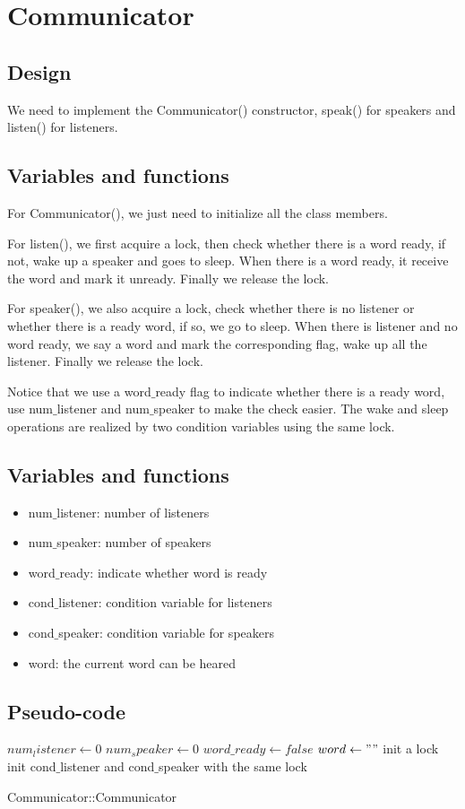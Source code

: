 \documentclass[a4paper,10pt]{article}
\begin{document}
\section{Communicator}
\subsection{Design}

We need to implement the Communicator() constructor, speak() for speakers and listen() for listeners.
\subsection{Variables and functions}
For Communicator(), we just need to initialize all the class members.

For listen(), we first acquire a lock, then check whether there is a word ready, if not, wake up a speaker and goes to sleep. When there is a word ready, it receive the word and mark it unready. Finally we release the lock.

For speaker(), we also acquire a lock, check whether there is no listener or whether there is a ready word, if so, we go to sleep. When there is listener and no word ready, we say a word and mark the corresponding flag, wake up all the listener. Finally we release the lock.

Notice that we use a word$\_$ready flag to indicate whether there is a ready word, use num$\_$listener and num$\_$speaker to make the check easier. The wake and sleep operations are realized by two condition variables using the same lock.
\subsection {Variables and functions}
\begin{itemize}
\item num$\_$listener: number of listeners
\item num$\_$speaker: number of speakers
\item word$\_$ready: indicate whether word is ready
\item cond$\_$listener: condition variable for listeners
\item cond$\_$speaker: condition variable for speakers
\item word: the current word can be heared
\end{itemize}
\subsection {Pseudo-code}
\begin{algorithm}
$num_listener \gets 0$\;
$num_speaker \gets 0$\;
$word\_ready \gets false$\;
$word \gets ""$\;
init a lock\;
init cond$\_$listener and cond$\_$speaker with the same lock\;
\caption{Communicator::Communicator}
\end{algorithm}
\end{document}
